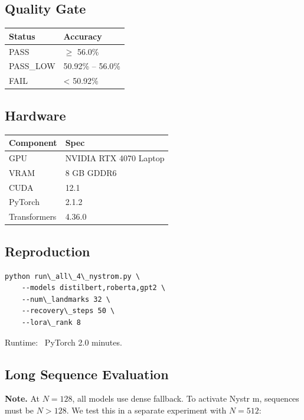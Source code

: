 \subsection{Quality Gate}

\begin{table}[H]
\centering
\small
\begin{tabular}{ll}
\toprule
\textbf{Status} & \textbf{Accuracy} \\
\midrule
PASS & $\ge$ 56.0\% \\
PASS\_LOW & 50.92\% -- 56.0\% \\
FAIL & \textless{} 50.92\% \\
\bottomrule
\end{tabular}
\end{table}

\subsection{Hardware}

\begin{table}[H]
\centering
\small
\begin{tabular}{ll}
\toprule
\textbf{Component} & \textbf{Spec} \\
\midrule
GPU & NVIDIA RTX 4070 Laptop \\
VRAM & 8 GB GDDR6 \\
CUDA & 12.1 \\
PyTorch & 2.1.2 \\
Transformers & 4.36.0 \\
\bottomrule
\end{tabular}
\end{table}

\subsection{Reproduction}

\begin{lstlisting}
python run\_all\_4\_nystrom.py \
    --models distilbert,roberta,gpt2 \
    --num\_landmarks 32 \
    --recovery\_steps 50 \
    --lora\_rank 8
\end{lstlisting}

Runtime: ~PyTorch 2.0 minutes.

\subsection{Long Sequence Evaluation}

\textbf{Note.} At $N = 128$, all models use dense fallback. To activate Nystr m, 
sequences must be $N > 128$. We test this in a separate experiment with 
$N = 512$:

